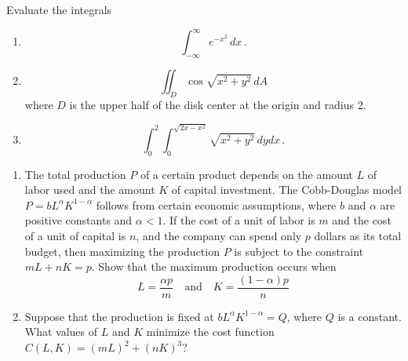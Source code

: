 \documentclass[12pt]{amsart}
\begin{document}
\newpage

\begin{problem}
Evaluate the integrals
\begin{enumerate}
	\item \begin{equation*}
		      \int_{-\infty}^\infty e^{-x^2} \, dx \,.
	      \end{equation*}
	      \vspace{8cm}

	\item \begin{equation*}
		      \iint_D \cos\sqrt{x^2 + y^2} \, dA
	      \end{equation*}
	      where $D$ is the upper half of the disk center at the origin and radius 2.
	      \vspace{8cm}

	\item \begin{equation*}
		      \int_0^2 \int_0^{\sqrt{2x - x^2}} \sqrt{x^2 + y^2} \, dy dx \,.
	      \end{equation*}
\end{enumerate}
\end{problem}
\newpage

\begin{problem}
\begin{enumerate}
	\item
	      The total production $P$ of a certain product depends on the amount $L$ of labor used and the amount $K$ of capital investment.
	      The Cobb-Douglas model $P = bL^{\alpha}K^{1-\alpha}$ follows from certain economic assumptions, where $b$ and $\alpha$ are positive constants and $\alpha < 1$. If the cost of a unit of labor is $m$ and the cost of a unit of capital is $n$, and the company can spend only $p$ dollars as its total budget, then maximizing the production $P$ is subject to the constraint $mL + nK = p$. Show that the maximum production occurs when
	      \[
		      L = \frac{\alpha p}{m} \quad \text{and} \quad K = \frac{(1 - \alpha)p}{n}
	      \]
	      \newpage

	\item Suppose that the production is fixed at $bL^{\alpha}K^{1-\alpha} = Q$, where $Q$ is a constant. What values of $L$ and $K$ minimize the cost function $C(L, K) = (mL)^2 + (nK)^3$?
\end{enumerate}
\end{problem}









\printbibliography
%
%
\end{document}
